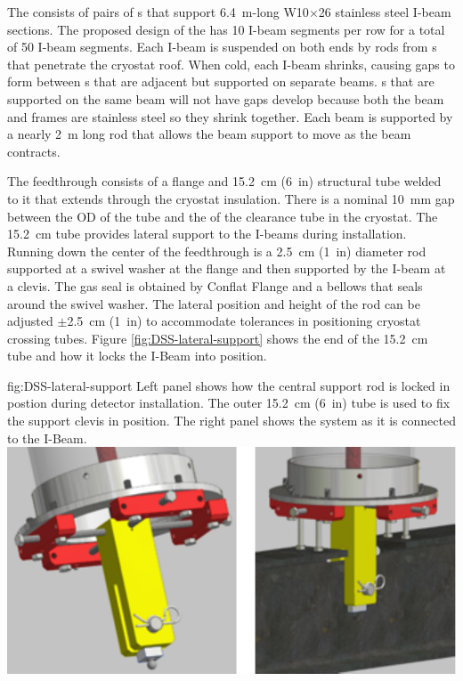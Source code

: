   The 
consists of pairs of \fdth{}s that support \SI{6.4}{m}-long
W10$\times$26 stainless steel I-beam sections. The proposed design of the
 has \num{10} I-beam segments per row for a total of
\num{50} I-beam segments. Each I-beam is suspended on both ends by
rods from \fdth{}s that penetrate the cryostat roof.  
When cold, each I-beam shrinks, causing gaps to form between
s that are adjacent but supported on separate beams.
s that are supported on the same beam will not have gaps
develop because both the beam and  frames %
are stainless steel so
they shrink together.  Each beam is supported by a nearly
\SI{2}{m} long rod that allows the beam support to move as the beam
contracts.

The feedthrough consists of a flange and \SI{15.2}{cm} (\SI{6}{in})  structural tube welded to it that extends through the cryostat insulation.  
There is a
nominal \SI{10}{mm} gap between the OD of the tube and the   of the clearance tube in the cryostat.
The \SI{15.2}{cm} tube provides lateral support to the I-beams during installation.
Running down the center of the feedthrough is a \SI{2.5}{cm} (\SI{1}{in}) diameter rod supported at a swivel washer at the flange and then supported by the
I-beam at a clevis.  The gas seal is obtained by Conflat Flange and a
bellows that seals around the swivel washer.  The lateral position and height of the rod can be adjusted $\pm$\SI{2.5}{cm} (\SI{1}{in}) to accommodate tolerances in positioning cryostat crossing tubes. Figure \ref{fig:DSS-lateral-support} shows the end of the  \SI{15.2}{cm} tube and how it locks the I-Beam into position. 

\begin{dunefigure}{fig:DSS-lateral-support}
  {Left panel shows how the central support rod is locked in postion during detector installation. The outer  \SI{15.2}{cm} (\SI{6}{in}) tube is used to fix the support clevis in position. The right panel shows the system as it is connected to the I-Beam.}
\includegraphics[width=.75\textwidth]{graphics/dss-lateral-support.pdf}
\end{dunefigure}

